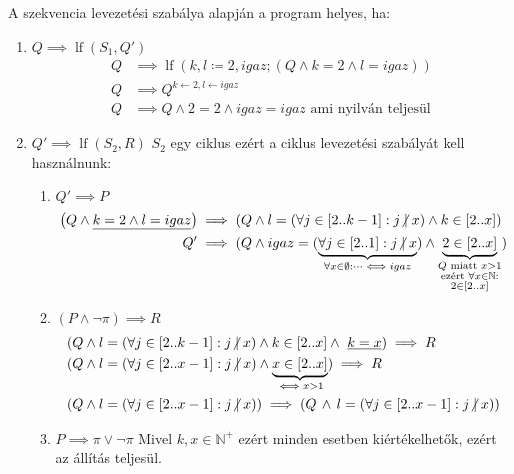 \documentclass[a4paper,12pt]{article}
\theoremstyle{definition}
\DeclareMathOperator{\lf}{lf}
\begin{document}
	\begin{solution}
		A szekvencia levezetési szabálya alapján a program helyes, ha:
		\begin{enumerate}
			\item {$ Q \implies \lf(S_1, Q') $
				\begin{align*}
					Q &\implies \lf(k,l \coloneq 2,igaz; \left( Q \land k = 2 \land l = igaz \right)) \\
					Q &\implies Q^{k \leftarrow 2, l \leftarrow igaz} \\
					Q &\implies Q \land 2 = 2 \land igaz = igaz \text{ ami nyilván teljesül}
				\end{align*}
			}
			\item $ Q' \implies \lf(S_2,R) $ $S_2$ egy ciklus ezért a ciklus levezetési szabályát kell használnunk:
			\begin{enumerate}
				\item $ Q' \implies P $
				\begin{align*}
					\left( Q \land \underline{k = 2 \land l = igaz} \right) &\implies \left( Q \land l = \left( \forall j \in \left[ 2..k-1\right]: j \centernot{|} x \right) \land k \in \left[ 2..x \right]  \right) \\
					Q' &\implies ( Q \land igaz = ( \underbrace{\forall j \in \left[ 2..1\right]: j \centernot{|} x }_{\forall x \in \emptyset: \dots \iff igaz}) \land \underbrace{ 2 \in \left[ 2..x \right]}_{\substack{Q \text{ miatt } x>1 \\ \text{ezért } \forall x \in \mathbb{N}: \\ 2 \in [2..x]}})
				\end{align*}
				\item $ (P \land \lnot \pi) \implies R $
				\begin{align*}
					( Q \land l &= ( \forall j \in \left[ 2..k-1\right]: j \centernot{|} x ) \land k \in \left[ 2..x \right] \land \ \underline{k = x} ) \implies R \\
					(Q \land l &= ( \forall j \in \left[ 2..x-1\right]: j \centernot{|} x ) \land \underbrace{x \in \left[ 2..x \right]}_{\iff x>1}  )\implies R \\
					(Q \land l &= ( \forall j \in \left[ 2..x-1\right]: j \centernot{|} x )) \implies (Q \, \land \, l = ( \forall j \in \left[2..x-1\right]: j \centernot{|} x)) 
				\end{align*}
				\item $ P \implies \pi \lor \lnot \pi $
				Mivel $k,x \in \mathbb{N}^{+}$ ezért minden esetben kiértékelhetők, ezért az állítás teljesül.

\end{enumerate}
\end{enumerate}
\end{solution}
\end{document}
